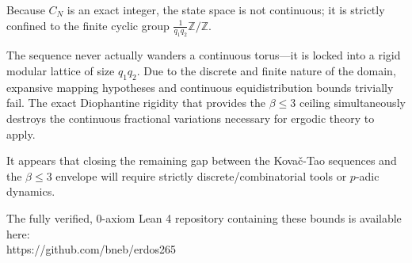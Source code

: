 \documentclass{article}
\begin{document}
Because $C_N$ is an exact integer, the state space is not continuous; it is strictly confined to the finite cyclic group $\frac{1}{q_1 q_2} \mathbb{Z} / \mathbb{Z}$. 

The sequence never actually wanders a continuous torus---it is locked into a rigid modular lattice of size $q_1 q_2$. Due to the discrete and finite nature of the domain, expansive mapping hypotheses and continuous equidistribution bounds trivially fail. The exact Diophantine rigidity that provides the $\beta \le 3$ ceiling simultaneously destroys the continuous fractional variations necessary for ergodic theory to apply.

It appears that closing the remaining gap between the Kova\v{c}-Tao sequences and the $\beta \le 3$ envelope will require strictly discrete/combinatorial tools or $p$-adic dynamics.

The fully verified, 0-axiom Lean 4 repository containing these bounds is available here:\\
https://github.com/bneb/erdos265
\end{document}
